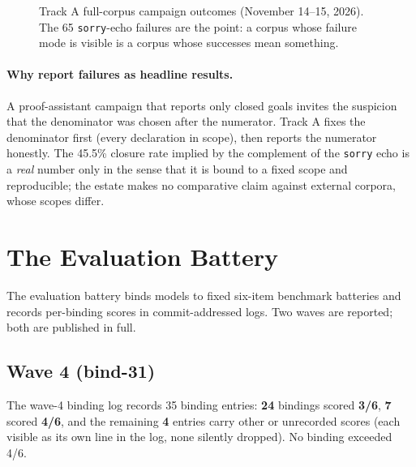 \begin{figure}[htbp]
\centering
{}
\caption{Track A full-corpus campaign outcomes (November 14--15, 2026). The 65 \texttt{sorry}-echo failures are the point: a corpus whose failure mode is visible is a corpus whose successes mean something.}
\label{fig:tracka}
\end{figure}

\paragraph{Why report failures as headline results.} A proof-assistant campaign that reports only closed goals invites the suspicion that the denominator was chosen after the numerator. Track A fixes the denominator first (every declaration in scope), then reports the numerator honestly. The 45.5\% closure rate implied by the complement of the \texttt{sorry} echo is a \emph{real} number only in the sense that it is bound to a fixed scope and reproducible; the estate makes no comparative claim against external corpora, whose scopes differ.

\section{The Evaluation Battery}
\label{sec:battery}

The evaluation battery binds models to fixed six-item benchmark batteries and records per-binding scores in commit-addressed logs. Two waves are reported; both are published in full.

\subsection{Wave 4 (bind-31)}
The wave-4 binding log records 35 binding entries: \textbf{24} bindings scored \textbf{3/6}, \textbf{7} scored \textbf{4/6}, and the remaining \textbf{4} entries carry other or unrecorded scores (each visible as its own line in the log, none silently dropped). No binding exceeded 4/6.

